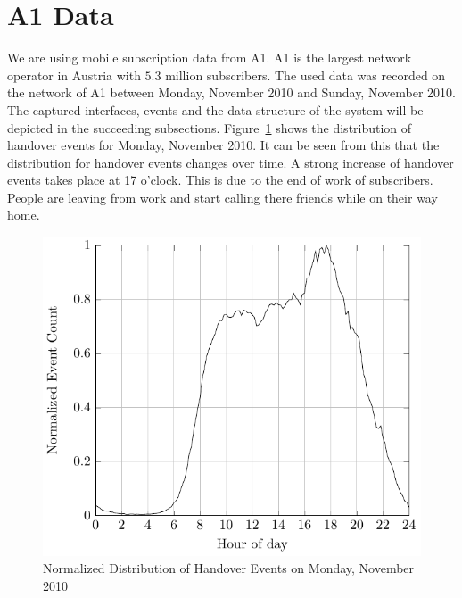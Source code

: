 \documentclass[master,english]{hgbthesis}
\begin{document}
\section{A1 Data}
We are using mobile subscription data from A1. A1 is the largest network operator in Austria with $5.3$ million subscribers. The used data was recorded on the network of A1 between Monday,  November 2010 and Sunday,  November 2010. The captured interfaces, events and the data structure of the system will be depicted in the succeeding subsections.
Figure~\ref{fig:disthandover} shows the distribution of handover events for Monday,  November 2010. It can be seen from this that the distribution for handover events changes over time. A strong increase of handover events takes place at 17 o'clock. This is due to the end of work of subscribers. People are leaving from work and start calling there friends while on their way home.
\begin{figure}
\centering
\includegraphics{./images/hauf_event_32_time_mat}
%
\caption{Normalized Distribution of Handover Events on Monday,  November 2010}
\label{fig:disthandover}
\end{figure}
\end{document}
